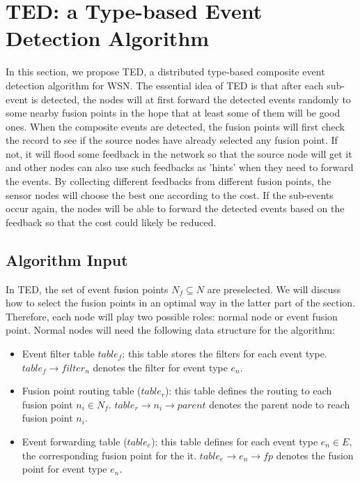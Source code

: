 \section{TED: a Type-based Event Detection Algorithm}
\label{sec:ted}
In this section, we propose TED, a distributed type-based composite event detection algorithm for WSN. The essential idea of TED is that after each sub-event is detected, the nodes will at first forward the detected events randomly to some nearby fusion points in the hope that at least some of them will be good ones. When the composite events are detected, the fusion points will first check the record to see if the source nodes have already selected any fusion point. If not, it will flood some feedback in the network so that the source node will get it and other nodes can also use such feedbacks as 'hints' when they need to forward the events. By collecting different feedbacks from different fusion points, the sensor nodes will choose the best one according to the cost. If the sub-events occur again, the nodes will be able to forward the detected events based on the feedback so that the cost could likely be reduced.

\subsection{Algorithm Input}
In TED, the set of event fusion points \(N_f\subseteq N\) are preselected. We will discuss how to select the fusion points in an optimal way in the latter part of the section. Therefore, each node will play two possible roles: normal node or event fusion point. Normal nodes will need the following data structure for the algorithm:
\begin{itemize}
\item Event filter table \(table_f\): this table stores the filters for each event type. \(table_f\rightarrow filter_n\) denotes the filter for event type \(e_n\).
\item Fusion point routing table (\(table_r\)): this table defines the routing to each fusion point \(n_i\in N_f\). \(table_r\rightarrow n_i\rightarrow parent\) denotes the parent node to reach fusion point \(n_i\).
\item Event forwarding table (\(table_e\)): this table defines for each event type \(e_n\in E\), the corresponding fusion point for the it. \(table_e\rightarrow e_n\rightarrow fp\) denotes the fusion point for event type \(e_n\).
\end{itemize}

